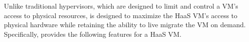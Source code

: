 %
%
%

Unlike traditional hypervisors, which are designed to limit and control a VM's 
access to physical resources, \na is designed to maximize the HaaS VM's 
access to physical hardware while retaining the ability to live migrate the VM on demand.
Specifically, \na provides the following features for a HaaS VM. 
